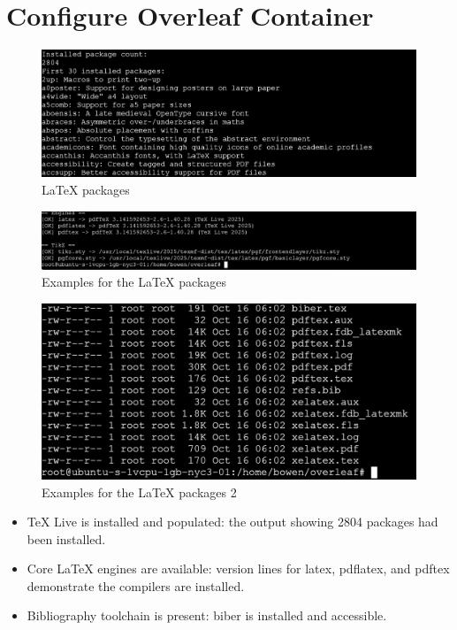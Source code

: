 \section{Configure Overleaf Container}
\begin{figure} [H]
\includegraphics[width=\textwidth]{png/packages.png}
  \centering
  \caption{LaTeX packages}
  \vspace{-0.3cm}
\end{figure}


\begin{figure} [H]
\includegraphics[width=\textwidth]{png/proof.png}
  \centering
  \caption{Examples for the LaTeX packages}
  \vspace{-0.3cm}
\end{figure}



\begin{figure} [H]
\includegraphics[width=\textwidth]{png/proof2.png}
  \centering
  \caption{Examples for the LaTeX packages 2}
  \vspace{-0.3cm}
\end{figure}


\begin{itemize}
  \item TeX Live is installed and populated: the output showing 2804 packages had been installed.
  \item Core LaTeX engines are available: version lines for latex, pdflatex, and pdftex demonstrate the compilers are installed.
  \item Bibliography toolchain is present: biber is installed and accessible.
\end{itemize}



